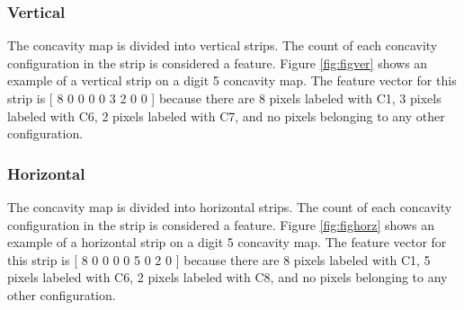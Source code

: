 \documentclass[conference]{IEEEtran}
\begin{document}
\subsubsection{Vertical}
The concavity map is divided into vertical strips. The count of each concavity configuration in the strip is considered a feature. Figure \ref{fig:figver} shows an example of a vertical strip on a digit 5 concavity map. The feature vector for this strip is [ 8 0 0 0 0 3 2 0 0 ] because there are 8 pixels labeled with C1, 3 pixels labeled with C6, 2 pixels labeled with C7, and no pixels belonging to any other configuration.
\subsubsection{Horizontal}

The concavity map is divided into horizontal strips. The count of each concavity configuration in the strip is considered a feature. Figure  \ref{fig:fighorz} shows an example of a horizontal strip on a digit 5 concavity map. The feature vector for this strip is [ 8 0 0 0 0 5 0 2 0 ] because there are 8 pixels labeled with C1, 5 pixels labeled with C6, 2 pixels labeled with C8, and no pixels belonging to any other configuration.
\end{document}
